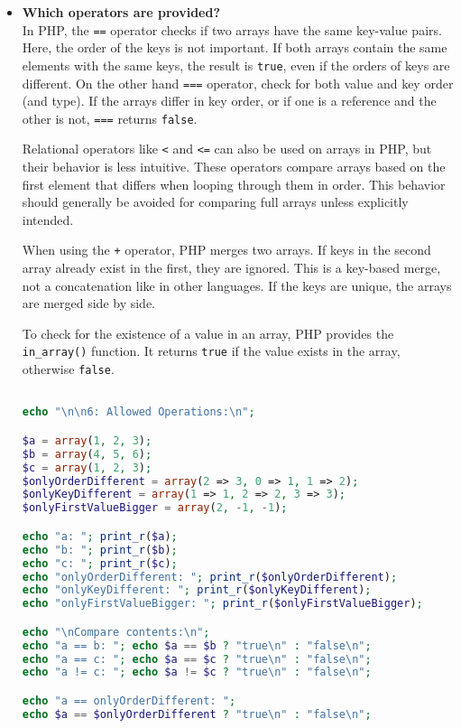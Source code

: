 \documentclass{article}
\begin{document}
\begin{itemize}
\item \textbf{Which operators are provided?} \\
In PHP, the \texttt{==} operator checks if two arrays have the same key-value pairs. Here, the order of the keys is not important. If both arrays contain the same elements with the same keys, the result is \texttt{true}, even if the orders of keys are different\cite{phpdocs}. On the other hand \texttt{===} operator, check for both value and key order (and type)\cite{phpdocs}. If the arrays differ in key order, or if one is a reference and the other is not, \texttt{===} returns \texttt{false}.

Relational operators like \texttt{<} and \texttt{<=} can also be used on arrays in PHP, but their behavior is less intuitive. These operators compare arrays based on the first element that differs when looping through them in order. This behavior should generally be avoided for comparing full arrays unless explicitly intended.

When using the \texttt{+} operator, PHP merges two arrays. If keys in the second array already exist in the first, they are ignored. This is a key-based merge, not a concatenation like in other languages. If the keys are unique, the arrays are merged side by side.

To check for the existence of a value in an array, PHP provides the \texttt{in\_array()} function. It returns \texttt{true} if the value exists in the array, otherwise \texttt{false}.


\begin{lstlisting}[language=PHP]

echo "\n\n6: Allowed Operations:\n";

$a = array(1, 2, 3);
$b = array(4, 5, 6);
$c = array(1, 2, 3);
$onlyOrderDifferent = array(2 => 3, 0 => 1, 1 => 2);
$onlyKeyDifferent = array(1 => 1, 2 => 2, 3 => 3);
$onlyFirstValueBigger = array(2, -1, -1);

echo "a: "; print_r($a);
echo "b: "; print_r($b);
echo "c: "; print_r($c);
echo "onlyOrderDifferent: "; print_r($onlyOrderDifferent);
echo "onlyKeyDifferent: "; print_r($onlyKeyDifferent);
echo "onlyFirstValueBigger: "; print_r($onlyFirstValueBigger);

echo "\nCompare contents:\n";
echo "a == b: "; echo $a == $b ? "true\n" : "false\n";
echo "a == c: "; echo $a == $c ? "true\n" : "false\n";
echo "a != c: "; echo $a != $c ? "true\n" : "false\n";

echo "a == onlyOrderDifferent: "; 
echo $a == $onlyOrderDifferent ? "true\n" : "false\n";


\end{lstlisting}
\end{itemize}
\end{document}
